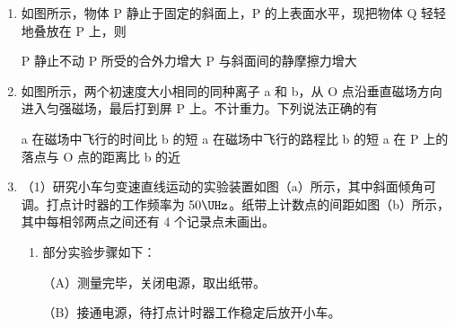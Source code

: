 \documentclass[\gkver]{gaokaozhenti}
\begin{document}
\begin{enumerate}

{甲、乙在同一高度的速度大小相等}
{甲、乙在同一时刻总能到达同一高度}
{甲比乙先到达 B 处}


\item
如图所示，物体 P 静止于固定的斜面上，P 的上表面水平，现把物体 Q 轻轻地叠放在 P 上，则


{P 静止不动}
{P 所受的合外力增大}
{P 与斜面间的静摩擦力增大}


\item
如图所示，两个初速度大小相同的同种离子 a 和 b，从 O 点沿垂直磁场方向进入匀强磁场，最后打到屏 P 上。不计重力。下列说法正确的有


{a 在磁场中飞行的时间比 b 的短}
{a 在磁场中飞行的路程比 b 的短}
{a 在 P 上的落点与 O 点的距离比 b 的近}


\item
（1）研究小车匀变速直线运动的实验装置如图（a）所示，其中斜面倾角可调。打点计时器的工作频率为 $50\UHz$。纸带上计数点的间距如图（b）所示，其中每相邻两点之间还有 4 个记录点未画出。
\begin{enumerate}
	\item
	部分实验步骤如下：

	（A）测量完毕，关闭电源，取出纸带。

	（B）接通电源，待打点计时器工作稳定后放开小车。


\end{enumerate}
\end{enumerate}
\end{document}
